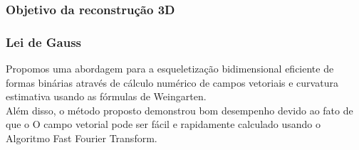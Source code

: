 \begin{frame}
  \frametitle{Objetivo da reconstrução 3D}
  \frametitle{Lei de Gauss}

Propomos uma abordagem para a esqueletização bidimensional eficiente de formas
binárias através de cálculo numérico de campos vetoriais e curvatura
estimativa usando as fórmulas de Weingarten.
\\
Além disso, o método proposto demonstrou bom desempenho
devido ao fato de que o O campo vetorial pode ser fácil e rapidamente
calculado usando o Algoritmo Fast Fourier Transform.
\end{frame}


